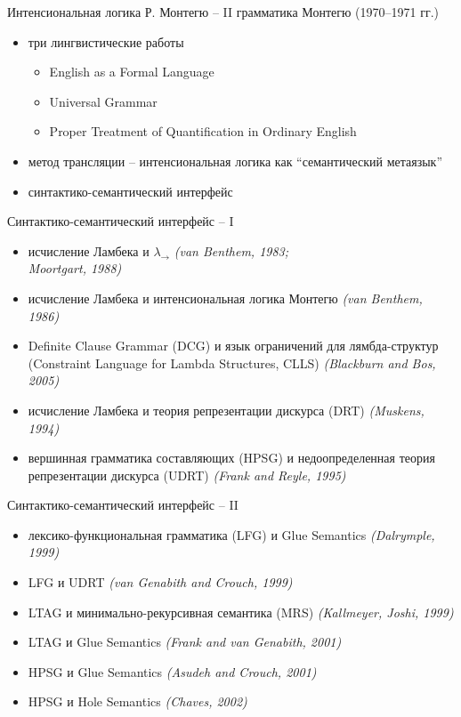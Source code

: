 \documentclass{beamer}
\begin{document}
\begin{frame}{Интенсиональная логика Р. Монтегю -- II}
грамматика Монтегю (1970--1971 гг.)\\
\bigskip
\begin{itemize}
    \item три лингвистические работы
    \begin{itemize}
        \item English as a Formal Language
        \item Universal Grammar
        \item Proper Treatment of Quantification in Ordinary English
    \end{itemize}
    \item метод трансляции -- интенсиональная логика как ``семантический метаязык''
    \item синтактико-семантический интерфейс
\end{itemize}
\end{frame}

\begin{frame}{Синтактико-семантический интерфейс -- I}
\begin{itemize}
    \item исчисление Ламбека и $\lambda_\to$ \textit{(van Benthem, 1983; \\Moortgart, 1988)}
    \item исчисление Ламбека и интенсиональная логика Монтегю \textit{(van Benthem, 1986)}
    \item Definite Clause Grammar (DCG) и язык ограничений для лямбда-структур (Constraint Language for Lambda Structures, CLLS) \textit{(Blackburn and Bos, 2005)}
    \item исчисление Ламбека и теория репрезентации дискурса (DRT) \textit{(Muskens, 1994)}
    \item вершинная грамматика составляющих (HPSG) и  недоопределенная теория репрезентации дискурса (UDRT) \textit{(Frank and Reyle, 1995)}
\end{itemize}
\end{frame}    	

\begin{frame}{Синтактико-семантический интерфейс -- II}
\begin{itemize}
    \item лексико-функциональная грамматика (LFG) и Glue Semantics \textit{(Dalrymple, 1999)}
    \item LFG и UDRT \textit{(van Genabith and Crouch, 1999)}
    \item LTAG и  минимально-рекурсивная семантика (MRS) \textit{(Kallmeyer, Joshi, 1999)}
    \item LTAG и Glue Semantics \textit{(Frank and van Genabith, 2001)} 
    \item HPSG и Glue Semantics \textit{(Asudeh and Crouch, 2001)}
    \item HPSG и Hole Semantics \textit{(Chaves, 2002)}
\end{itemize}
\end{frame}    	
\end{document}
